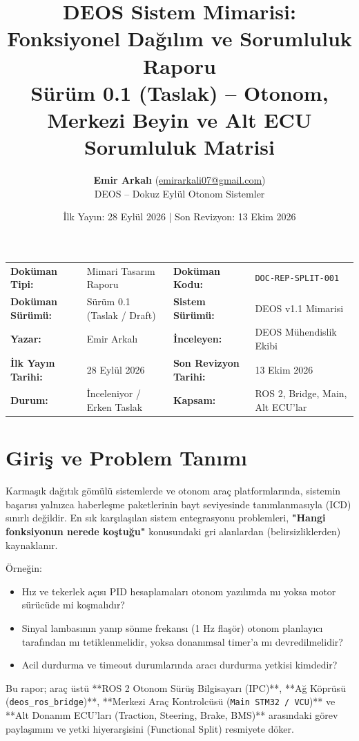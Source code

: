 \documentclass[a4paper,11pt]{article}
\title{\textbf{DEOS Sistem Mimarisi: Fonksiyonel Dağılım ve Sorumluluk Raporu}\\
\large Sürüm 0.1 (Taslak) -- Otonom, Merkezi Beyin ve Alt ECU Sorumluluk Matrisi}
\author{\textbf{Emir Arkalı} (\href{mailto:emirarkali07@gmail.com}{emirarkali07@gmail.com})\\DEOS -- Dokuz Eylül Otonom Sistemler}
\date{İlk Yayın: 28 Eylül 2026 \quad | \quad Son Revizyon: 13 Ekim 2026}
\begin{document}
\maketitle

\begin{center}
\small
\begin{tabularx}{\textwidth}{p{3.2cm}p{4.5cm} p{3.2cm}X}
\toprule
\textbf{Doküman Tipi:} & Mimari Tasarım Raporu & \textbf{Doküman Kodu:} & \texttt{DOC-REP-SPLIT-001} \\
\textbf{Doküman Sürümü:} & Sürüm 0.1 (Taslak / Draft) & \textbf{Sistem Sürümü:} & DEOS v1.1 Mimarisi \\
\textbf{Yazar:} & Emir Arkalı & \textbf{İnceleyen:} & DEOS Mühendislik Ekibi \\
\textbf{İlk Yayın Tarihi:} & 28 Eylül 2026 & \textbf{Son Revizyon Tarihi:} & 13 Ekim 2026 \\
\textbf{Durum:} & İnceleniyor / Erken Taslak & \textbf{Kapsam:} & ROS 2, Bridge, Main, Alt ECU'lar \\
\bottomrule
\end{tabularx}
\end{center}

\vspace{1em}

\section{Giriş ve Problem Tanımı}

Karmaşık dağıtık gömülü sistemlerde ve otonom araç platformlarında, sistemin başarısı yalnızca haberleşme paketlerinin bayt seviyesinde tanımlanmasıyla (ICD) sınırlı değildir. En sık karşılaşılan sistem entegrasyonu problemleri, \textbf{"Hangi fonksiyonun nerede koştuğu"} konusundaki gri alanlardan (belirsizliklerden) kaynaklanır.

Örneğin:
\begin{itemize}
    \item Hız ve tekerlek açısı PID hesaplamaları otonom yazılımda mı yoksa motor sürücüde mi koşmalıdır?
    \item Sinyal lambasının yanıp sönme frekansı (1 Hz flaşör) otonom planlayıcı tarafından mı tetiklenmelidir, yoksa donanımsal timer'a mı devredilmelidir?
    \item Acil durdurma ve timeout durumlarında aracı durdurma yetkisi kimdedir?
\end{itemize}

Bu rapor; araç üstü **ROS 2 Otonom Sürüş Bilgisayarı (IPC)**, **Ağ Köprüsü (\texttt{deos\_ros\_bridge})**, **Merkezi Araç Kontrolcüsü (\texttt{Main STM32 / VCU})** ve **Alt Donanım ECU'ları (Traction, Steering, Brake, BMS)** arasındaki görev paylaşımını ve yetki hiyerarşisini (Functional Split) resmiyete döker.
\end{document}
